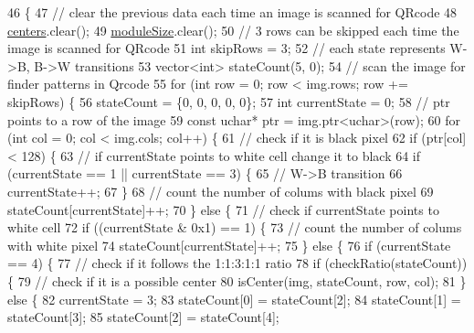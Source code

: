 \begin{DoxyCode}
46                                   \{
47   \textcolor{comment}{// clear the previous data each time an image is scanned for QRcode}
48   \hyperlink{classdetectQRcode_afe6facdb30c910a01e4f607d108a5db5}{centers}.clear();
49   \hyperlink{classdetectQRcode_a5f57e433cf4135aa0bf236dee35ff044}{moduleSize}.clear();
50   \textcolor{comment}{// 3 rows can be skipped each time the image is scanned for QRcode}
51   \textcolor{keywordtype}{int} skipRows = 3;
52   \textcolor{comment}{// each state represents W->B, B->W transitions}
53   vector<int> stateCount(5, 0);
54   \textcolor{comment}{// scan the image for finder patterns in Qrcode}
55   \textcolor{keywordflow}{for} (\textcolor{keywordtype}{int} row = 0; row < img.rows; row += skipRows) \{
56     stateCount = \{0, 0, 0, 0, 0\};
57     \textcolor{keywordtype}{int} currentState = 0;
58     \textcolor{comment}{// ptr points to a row of the image}
59     \textcolor{keyword}{const} uchar* ptr = img.ptr<uchar>(row);
60     \textcolor{keywordflow}{for} (\textcolor{keywordtype}{int} col = 0; col < img.cols; col++) \{
61        \textcolor{comment}{// check if it is black pixel}
62        \textcolor{keywordflow}{if} (ptr[col] < 128) \{
63          \textcolor{comment}{// if currentState points to white cell change it to black}
64          \textcolor{keywordflow}{if} (currentState == 1 || currentState == 3) \{
65             \textcolor{comment}{// W->B transition}
66             currentState++;
67           \}
68          \textcolor{comment}{// count the number of colums with black pixel}
69          stateCount[currentState]++;
70        \} \textcolor{keywordflow}{else} \{
71           \textcolor{comment}{// check if currentState points to white cell}
72           \textcolor{keywordflow}{if} ((currentState & 0x1) == 1) \{
73              \textcolor{comment}{// count the number of colums with white pixel}
74              stateCount[currentState]++;
75           \} \textcolor{keywordflow}{else} \{
76              \textcolor{keywordflow}{if} (currentState == 4) \{
77               \textcolor{comment}{// check if it follows the 1:1:3:1:1 ratio}
78               \textcolor{keywordflow}{if} (checkRatio(stateCount)) \{
79                 \textcolor{comment}{// check if it is a possible center}
80                 isCenter(img, stateCount, row, col);
81               \} \textcolor{keywordflow}{else} \{
82                 currentState = 3;
83                 stateCount[0] = stateCount[2];
84                 stateCount[1] = stateCount[3];
85                 stateCount[2] = stateCount[4];

\end{DoxyCode}
